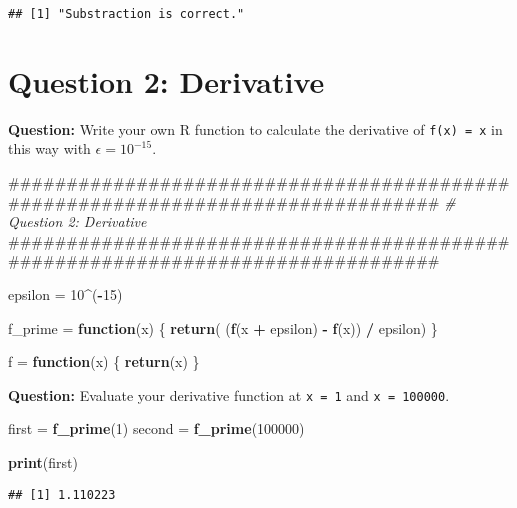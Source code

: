 \documentclass[]{article}
\newenvironment{Shaded}{\begin{snugshade}}{\end{snugshade}}
\newcommand{\KeywordTok}[1]{\textcolor[rgb]{0.13,0.29,0.53}{\textbf{#1}}}
\newcommand{\DecValTok}[1]{\textcolor[rgb]{0.00,0.00,0.81}{#1}}
\newcommand{\StringTok}[1]{\textcolor[rgb]{0.31,0.60,0.02}{#1}}
\newcommand{\CommentTok}[1]{\textcolor[rgb]{0.56,0.35,0.01}{\textit{#1}}}
\newcommand{\ControlFlowTok}[1]{\textcolor[rgb]{0.13,0.29,0.53}{\textbf{#1}}}
\newcommand{\OperatorTok}[1]{\textcolor[rgb]{0.81,0.36,0.00}{\textbf{#1}}}
\newcommand{\NormalTok}[1]{#1}
\begin{document}
\begin{verbatim}
## [1] "Substraction is correct."
\end{verbatim}

\section{Question 2: Derivative}\label{question-2-derivative}

\textbf{Question:} Write your own R function to calculate the derivative
of \texttt{f(x)\ =\ x} in this way with \(\epsilon = 10^{-15}\).

\begin{Shaded}
\begin{Highlighting}[]
\NormalTok{################################################################################}
\CommentTok{# Question 2: Derivative}
\NormalTok{################################################################################}

\NormalTok{epsilon =}\StringTok{ }\DecValTok{10}\OperatorTok{^}\NormalTok{(}\OperatorTok{-}\DecValTok{15}\NormalTok{)}

\NormalTok{f_prime =}\StringTok{ }\ControlFlowTok{function}\NormalTok{(x) \{}
  \KeywordTok{return}\NormalTok{( (}\KeywordTok{f}\NormalTok{(x }\OperatorTok{+}\StringTok{ }\NormalTok{epsilon) }\OperatorTok{-}\StringTok{ }\KeywordTok{f}\NormalTok{(x)) }\OperatorTok{/}\StringTok{ }\NormalTok{epsilon)}
\NormalTok{\}}

\NormalTok{f =}\StringTok{ }\ControlFlowTok{function}\NormalTok{(x) \{}
  \KeywordTok{return}\NormalTok{(x)}
\NormalTok{\}}
\end{Highlighting}
\end{Shaded}

\textbf{Question:} Evaluate your derivative function at \texttt{x\ =\ 1}
and \texttt{x\ =\ 100000}.

\begin{Shaded}
\begin{Highlighting}[]
\NormalTok{first =}\StringTok{ }\KeywordTok{f_prime}\NormalTok{(}\DecValTok{1}\NormalTok{)}
\NormalTok{second =}\StringTok{ }\KeywordTok{f_prime}\NormalTok{(}\DecValTok{100000}\NormalTok{)}

\KeywordTok{print}\NormalTok{(first)}
\end{Highlighting}
\end{Shaded}

\begin{verbatim}
## [1] 1.110223
\end{verbatim}
\end{document}
